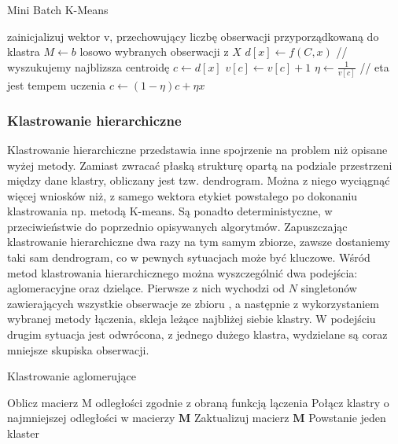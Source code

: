 \documentclass{article}
\begin{document}
\begin{algorithm}
\label{batch_k_means}
\caption{Mini Batch K-Means}
\begin{algorithmic}[1]
\STATE zainicjalizuj wektor v, przechowujący liczbę obserwacji przyporządkowaną do 
klastra
	\STATE $M \leftarrow b$ losowo wybranych obserwacji z $X$
		\STATE $d[x] \leftarrow f(C,x)$ // wyszukujemy najblizsza centroidę
	\ENDFOR
		\STATE $c \leftarrow d[x]$
		\STATE $v[c] \leftarrow v[c] + 1$
		\STATE $\eta \leftarrow \frac{1}{v[c]}$ // eta jest tempem uczenia
		\STATE $c \leftarrow (1 - \eta)c + \eta x$ 
	\ENDFOR
\ENDFOR
\end{algorithmic}
\end{algorithm}

\subsubsection{Klastrowanie hierarchiczne}
Klastrowanie hierarchiczne przedstawia inne spojrzenie na problem niż opisane wyżej metody. Zamiast zwracać płaską strukturę opartą na podziale przestrzeni między dane klastry, obliczany jest tzw. dendrogram. 
Można z niego wyciągnąć więcej wniosków niż, z samego wektora etykiet powstałego po dokonaniu klastrowania np. metodą K-means.
Są ponadto deterministyczne, w przeciwieństwie do poprzednio opisywanych algorytmów.
Zapuszczając klastrowanie hierarchiczne dwa razy na tym samym zbiorze, zawsze dostaniemy taki sam dendrogram, co w pewnych sytuacjach może być kluczowe.
Wśród metod klastrowania hierarchicznego można wyszczególnić dwa podejścia: aglomeracyjne oraz dzielące.
Pierwsze z nich wychodzi od $N$ singletonów zawierających wszystkie obserwacje ze zbioru , a następnie z wykorzystaniem wybranej metody łączenia, skleja leżące najbliżej siebie klastry. 
W podejściu drugim sytuacja jest odwrócona, z jednego dużego klastra, wydzielane są coraz mniejsze skupiska obserwacji.


\begin{algorithm}
\label{agglomerative}
\caption{Klastrowanie aglomerujące}
\begin{algorithmic}[1]
\STATE Oblicz macierz M odległości zgodnie z obraną funkcją lączenia
\REPEAT
\STATE Połącz klastry o najmniejszej odległości w macierzy $\textbf{M}$ 
\STATE Zaktualizuj macierz $\textbf{M}$ 
\UNTIL Powstanie jeden klaster
\end{algorithmic}
\end{algorithm}
\end{document}
